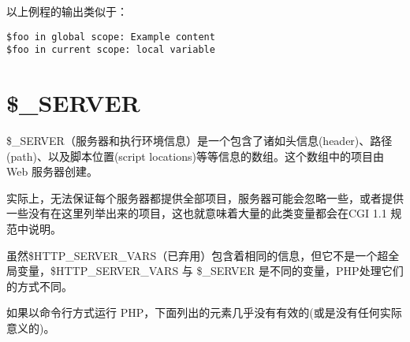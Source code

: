 以上例程的输出类似于：

\begin{verbatim}
$foo in global scope: Example content
$foo in current scope: local variable
\end{verbatim}


\section{\$\_SERVER}


\$\_SERVER（服务器和执行环境信息）是一个包含了诸如头信息(header)、路径(path)、以及脚本位置(script locations)等等信息的数组。这个数组中的项目由 Web 服务器创建。

实际上，无法保证每个服务器都提供全部项目，服务器可能会忽略一些，或者提供一些没有在这里列举出来的项目，这也就意味着大量的此类变量都会在CGI 1.1 规范中说明。

虽然\$HTTP\_SERVER\_VARS（已弃用）包含着相同的信息，但它不是一个超全局变量，\$HTTP\_SERVER\_VARS 与 \$\_SERVER 是不同的变量，PHP处理它们的方式不同。


如果以命令行方式运行 PHP，下面列出的元素几乎没有有效的(或是没有任何实际意义的)。

